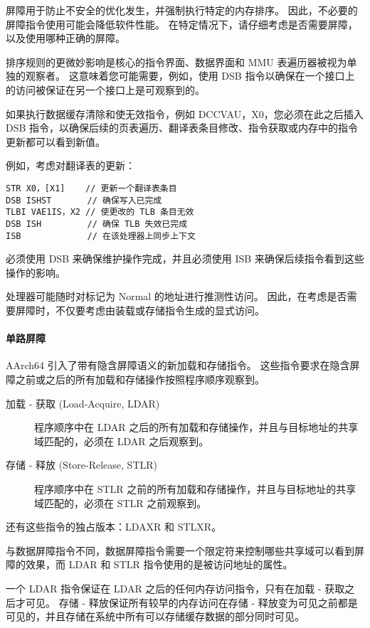 屏障用于防止不安全的优化发生，并强制执行特定的内存排序。
因此，不必要的屏障指令使用可能会降低软件性能。
在特定情况下，请仔细考虑是否需要屏障，以及使用哪种正确的屏障。

排序规则的更微妙影响是核心的指令界面、数据界面和 MMU 表遍历器被视为单独的观察者。
这意味着您可能需要，例如，使用 DSB 指令以确保在一个接口上的访问被保证在另一个接口上是可观察到的。

如果执行数据缓存清除和使无效指令，例如 DCCVAU，X0，您必须在此之后插入 DSB 指令，以确保后续的页表遍历、翻译表条目修改、指令获取或内存中的指令更新都可以看到新值。

例如，考虑对翻译表的更新：

\begin{lstlisting}
STR X0，[X1]    // 更新一个翻译表条目
DSB ISHST       // 确保写入已完成
TLBI VAE1IS，X2 // 使更改的 TLB 条目无效
DSB ISH         // 确保 TLB 失效已完成
ISB             // 在该处理器上同步上下文
\end{lstlisting}

必须使用 DSB 来确保维护操作完成，并且必须使用 ISB 来确保后续指令看到这些操作的影响。

处理器可能随时对标记为 Normal 的地址进行推测性访问。
因此，在考虑是否需要屏障时，不仅要考虑由装载或存储指令生成的显式访问。

\paragraph{单路屏障}

AArch64
引入了带有隐含屏障语义的新加载和存储指令。
这些指令要求在隐含屏障之前或之后的所有加载和存储操作按照程序顺序观察到。

\begin{description}
\item
  [加载 - 获取 (Load-Acquire, LDAR)]
    程序顺序中在 LDAR 之后的所有加载和存储操作，并且与目标地址的共享域匹配的，必须在 LDAR 之后观察到。
\item
  [存储 - 释放 (Store-Release, STLR)]
    程序顺序中在 STLR 之前的所有加载和存储操作，并且与目标地址的共享域匹配的，必须在 STLR 之前观察到。
\end{description}

还有这些指令的独占版本：LDAXR 和 STLXR。

与数据屏障指令不同，数据屏障指令需要一个限定符来控制哪些共享域可以看到屏障的效果，而 LDAR 和 STLR 指令使用的是被访问地址的属性。

一个 LDAR 指令保证在 LDAR 之后的任何内存访问指令，只有在加载 - 获取之后才可见。
存储 - 释放保证所有较早的内存访问在存储 - 释放变为可见之前都是可见的，并且存储在系统中所有可以存储缓存数据的部分同时可见。

